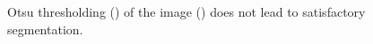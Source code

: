 \documentclass[
  digital,     %
  oneside,     %
  nosansbold,  %
  nocolorbold, %
  lof,         %
  lot,         %
]{fithesis4}
\begin{document}
\begin{figure}
    \begin{subfigure}[t]{0.45\textwidth}
        \centering
        \caption{}
        \label{fig:otsu-nuclei}
    \end{subfigure}
    \hfill
    \begin{subfigure}[t]{0.45\textwidth}
        \centering
        \caption{}
        \label{fig:otsu-naive}
    \end{subfigure}
    \caption{Otsu thresholding () of the image () does not lead to satisfactory segmentation.}
    \label{fig:otsu-nuclei-demo}
\end{figure}
\end{document}
